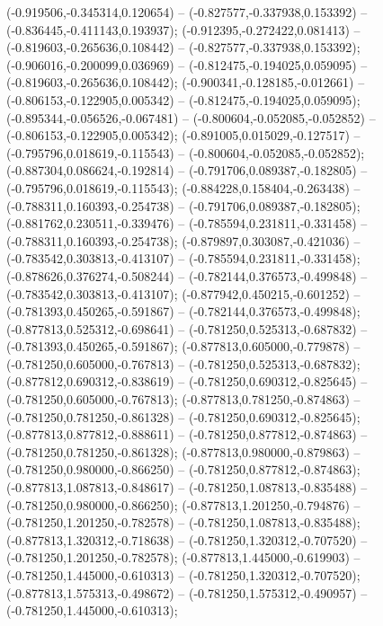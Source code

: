  (-0.919506,-0.345314,0.120654) -- (-0.827577,-0.337938,0.153392) -- (-0.836445,-0.411143,0.193937);
 (-0.912395,-0.272422,0.081413) -- (-0.819603,-0.265636,0.108442) -- (-0.827577,-0.337938,0.153392);
 (-0.906016,-0.200099,0.036969) -- (-0.812475,-0.194025,0.059095) -- (-0.819603,-0.265636,0.108442);
 (-0.900341,-0.128185,-0.012661) -- (-0.806153,-0.122905,0.005342) -- (-0.812475,-0.194025,0.059095);
 (-0.895344,-0.056526,-0.067481) -- (-0.800604,-0.052085,-0.052852) -- (-0.806153,-0.122905,0.005342);
 (-0.891005,0.015029,-0.127517) -- (-0.795796,0.018619,-0.115543) -- (-0.800604,-0.052085,-0.052852);
 (-0.887304,0.086624,-0.192814) -- (-0.791706,0.089387,-0.182805) -- (-0.795796,0.018619,-0.115543);
 (-0.884228,0.158404,-0.263438) -- (-0.788311,0.160393,-0.254738) -- (-0.791706,0.089387,-0.182805);
 (-0.881762,0.230511,-0.339476) -- (-0.785594,0.231811,-0.331458) -- (-0.788311,0.160393,-0.254738);
 (-0.879897,0.303087,-0.421036) -- (-0.783542,0.303813,-0.413107) -- (-0.785594,0.231811,-0.331458);
 (-0.878626,0.376274,-0.508244) -- (-0.782144,0.376573,-0.499848) -- (-0.783542,0.303813,-0.413107);
 (-0.877942,0.450215,-0.601252) -- (-0.781393,0.450265,-0.591867) -- (-0.782144,0.376573,-0.499848);
 (-0.877813,0.525312,-0.698641) -- (-0.781250,0.525313,-0.687832) -- (-0.781393,0.450265,-0.591867);
 (-0.877813,0.605000,-0.779878) -- (-0.781250,0.605000,-0.767813) -- (-0.781250,0.525313,-0.687832);
 (-0.877812,0.690312,-0.838619) -- (-0.781250,0.690312,-0.825645) -- (-0.781250,0.605000,-0.767813);
 (-0.877813,0.781250,-0.874863) -- (-0.781250,0.781250,-0.861328) -- (-0.781250,0.690312,-0.825645);
 (-0.877813,0.877812,-0.888611) -- (-0.781250,0.877812,-0.874863) -- (-0.781250,0.781250,-0.861328);
 (-0.877813,0.980000,-0.879863) -- (-0.781250,0.980000,-0.866250) -- (-0.781250,0.877812,-0.874863);
 (-0.877813,1.087813,-0.848617) -- (-0.781250,1.087813,-0.835488) -- (-0.781250,0.980000,-0.866250);
 (-0.877813,1.201250,-0.794876) -- (-0.781250,1.201250,-0.782578) -- (-0.781250,1.087813,-0.835488);
 (-0.877813,1.320312,-0.718638) -- (-0.781250,1.320312,-0.707520) -- (-0.781250,1.201250,-0.782578);
 (-0.877813,1.445000,-0.619903) -- (-0.781250,1.445000,-0.610313) -- (-0.781250,1.320312,-0.707520);
 (-0.877813,1.575313,-0.498672) -- (-0.781250,1.575312,-0.490957) -- (-0.781250,1.445000,-0.610313);
